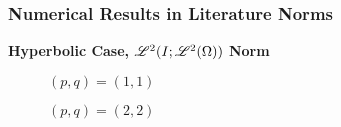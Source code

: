 \begin{frame}
    \frametitle{Numerical Results in Literature Norms}

    \vspace*{\fill}
    \begin{center}
        {\color{\accentcolor} \Large \textbf{Hyperbolic Case, $\mathscr{L}^{2}(I; \mathscr{L}^{2}(\Omega))$ Norm}}
    \end{center}

    \vspace*{\fill}

    \begin{multicols}{2}

        \begin{center}
            \begin{minipage}{0.455\textwidth}
                \begin{figure}[!ht]
                    \caption{$\left( p, q  \right) = \left( 1, 1  \right)$}
                    \label{fig:p_1_1_hyp_l2l2}
                    
                \end{figure}
            \end{minipage}
        \end{center}
        \vspace*{\fill}

        \vfill\null
        \columnbreak

        \begin{center}
            \begin{minipage}{0.455\textwidth}
                \begin{figure}[!ht]
                    \caption{$\left( p, q  \right) = \left( 2, 2  \right)$}
                    \label{fig:p_2_2_hyp_l2l2}
                    
                \end{figure}
            \end{minipage}
        \end{center}
        \vspace*{\fill}

    \end{multicols}
    \vspace*{\fill}
    
\end{frame}


